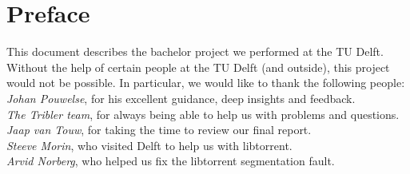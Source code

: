\chapter*{Preface}
This document describes the bachelor project we performed at the TU Delft. Without the help of certain people at the TU Delft (and outside), this project would not be possible. In particular, we would like to thank the following people: \\

\emph{Johan Pouwelse}, for his excellent guidance, deep insights and feedback.\\

\emph{The Tribler team}, for always being able to help us with problems and questions.\\

\emph{Jaap van Touw}, for taking the time to review our final report.\\

\emph{Steeve Morin}, who visited Delft to help us with libtorrent.\\

\emph{Arvid Norberg}, who helped us fix the libtorrent segmentation fault.
